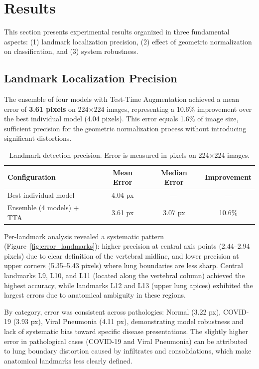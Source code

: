 \documentclass[applsci,article,submit,pdftex,moreauthors]{Definitions/mdpi}
\begin{document}
\section{Results}

This section presents experimental results organized in three fundamental aspects: (1) landmark localization precision, (2) effect of geometric normalization on classification, and (3) system robustness.

\subsection{Landmark Localization Precision}

The ensemble of four models with Test-Time Augmentation achieved a mean error of \textbf{3.61 pixels} on 224$\times$224 images, representing a 10.6\% improvement over the best individual model (4.04 pixels). This error equals 1.6\% of image size, sufficient precision for the geometric normalization process without introducing significant distortions.

\begin{table}[H]
\caption{Landmark detection precision. Error is measured in pixels on 224$\times$224 images.\label{tab:landmarks}}
\begin{tabularx}{\textwidth}{XCCC}
\toprule
\textbf{Configuration} & \textbf{Mean Error} & \textbf{Median Error} & \textbf{Improvement}\\
\midrule
Best individual model & 4.04 px & --- & ---\\
Ensemble (4 models) + TTA & 3.61 px & 3.07 px & 10.6\%\\
\bottomrule
\end{tabularx}
\end{table}

Per-landmark analysis revealed a systematic pattern (Figure~\ref{fig:error_landmarks}): higher precision at central axis points (2.44--2.94 pixels) due to clear definition of the vertebral midline, and lower precision at upper corners (5.35--5.43 pixels) where lung boundaries are less sharp. Central landmarks L9, L10, and L11 (located along the vertebral column) achieved the highest accuracy, while landmarks L12 and L13 (upper lung apices) exhibited the largest errors due to anatomical ambiguity in these regions.

By category, error was consistent across pathologies: Normal (3.22 px), COVID-19 (3.93 px), Viral Pneumonia (4.11 px), demonstrating model robustness and lack of systematic bias toward specific disease presentations. The slightly higher error in pathological cases (COVID-19 and Viral Pneumonia) can be attributed to lung boundary distortion caused by infiltrates and consolidations, which make anatomical landmarks less clearly defined.
\end{document}
